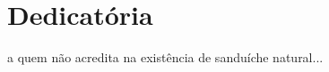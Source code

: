 \chapter*{Dedicatória}

\null\vskip15cm%
\begin{flushright}
    a quem não acredita na existência de sanduíche natural...
\end{flushright}
\vfill\newpage

\cleardoublepage